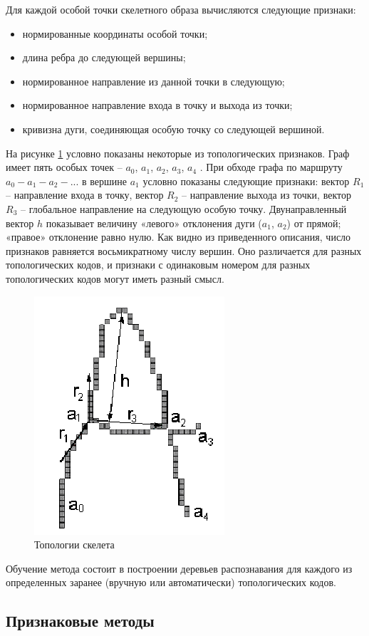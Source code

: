 Для каждой особой точки скелетного образа вычисляются следующие признаки:
\begin{itemize}
\item нормированные координаты особой точки;
\item длина ребра до следующей вершины;
\item нормированное направление из данной точки в следующую;
\item нормированное направление входа в точку и выхода из точки;
\item кривизна дуги, соединяющая особую точку со следующей вершиной.
\end{itemize}

На рисунке \ref{img_skelet_2} условно показаны некоторые из топологических признаков. Граф
имеет пять особых точек -- $a_0$, $a_1$, $a_2$, $a_3$, $a_4$ . При обходе графа по маршруту $a_0-a_1-a_2-...$ в вершине $a_1$ условно показаны следующие признаки: вектор $R_1$ -- направление входа в точку, вектор $R_2$ -- направление выхода из точки, вектор $R_3$ -- глобальное направление
на следующую особую точку. Двунаправленный вектор $h$ показывает величину
«левого» отклонения дуги ($a_1$, $a_2$) от прямой; «правое» отклонение равно нулю.
Как видно из приведенного описания, число признаков равняется
восьмикратному числу вершин. Оно различается для разных топологических кодов, и
признаки с одинаковым номером для разных топологических кодов могут иметь
разный смысл.

\begin{figure}[h]
\centering
\includegraphics[width=0.25\linewidth,keepaspectratio]{images/intro_skelet_2}
\caption{Топологии скелета}
\label{img_skelet_2}
\end{figure}

Обучение метода состоит в построении деревьев распознавания для каждого из
определенных заранее (вручную или автоматически) топологических кодов.

\subsection{Признаковые методы}

